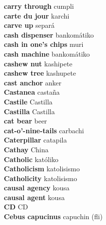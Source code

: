 \textbf{ carry through  } cumpli \\
\textbf{ carte du jour  } karchi \\
\textbf{ carve up  } separá \\
\textbf{ cash dispenser  } bankomátiko \\
\textbf{ cash in one’s chips  } muri \\
\textbf{ cash machine  } bankomátiko \\
\textbf{ cashew nut  } kashipete \\
\textbf{ cashew tree  } kashupete \\
\textbf{ cast anchor  } anker \\
\textbf{ Castanea  } castaña \\
\textbf{ Castile  } Castilla \\
\textbf{ Castilla  } Castilla \\
\textbf{ cat bear  } beer \\
\textbf{ cat-o’-nine-tails  } carbachi \\
\textbf{ Caterpillar  } catapila \\
\textbf{ Cathay  } China \\
\textbf{ Catholic  } katóliko \\
\textbf{ Catholicism  } katolisismo \\
\textbf{ Catholicity  } katolisismo \\
\textbf{ causal agency  } kousa \\
\textbf{ causal agent  } kousa \\
\textbf{ CD  } CD \\
\textbf{ Cebus capucinus  } capuchin (fli) \\
